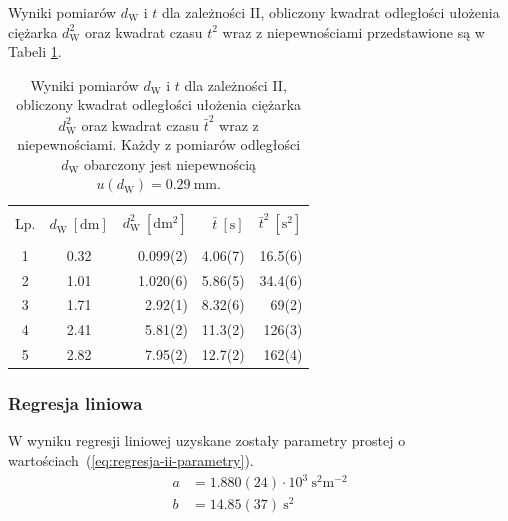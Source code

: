 \documentclass[twocolumn, a4paper, polish, 10pt]{article}
\newcommand{\dwSq}{\ensuremath{ d_{\mathrm{W}}^2 }}
\begin{document}
Wyniki pomiarów $d_{\mathrm{W}}$ i $t$ dla zależności II, obliczony kwadrat odległości ułożenia ciężarka $\dwSq$ oraz kwadrat czasu $t^2$ wraz z niepewnościami przedstawione są w Tabeli \ref{tab:zaleznosc-ii}.
\begin{table}[ht]
\begin{center}
\renewcommand*{\tablename}{Tabela}
\caption{\small Wyniki pomiarów $d_{\mathrm{W}}$ i $t$ dla zależności II, obliczony kwadrat odległości ułożenia ciężarka $\dwSq$ oraz kwadrat czasu $\bar{t}^2$ wraz z niepewnościami. Każdy z pomiarów odległości $d_{\mathrm{W}}$ obarczony jest niepewnością $u(d_{\mathrm{W}}) = 0.29~\mathrm{mm}$.\vspace{0.15cm}
    \label{tab:zaleznosc-ii}}
    {\small
    \begin{tabular}{c c r r r}
    \hline \vspace{-0.35cm} \\
      Lp. & $d_{\mathrm{W}}~[\mathrm{dm}]$ & $\dwSq~[\mathrm{dm^2}]$
      & $\bar{t}~[\mathrm{s}]$ & $\bar{t}^2~[\mathrm{s^2}]$ \\ 
      \hline \vspace{-0.2cm} \\
      1 & 0.32 & 0.099(2) & 4.06(7) & 16.5(6) \\
      2 & 1.01 & 1.020(6) & 5.86(5) & 34.4(6) \\
      3 & 1.71 & 2.92(1) & 8.32(6) & 69(2) \\
      4 & 2.41 & 5.81(2) & 11.3(2) & 126(3) \\
      5 & 2.82 & 7.95(2) & 12.7(2) & 162(4) \\
    \hline
    \end{tabular}}
    \end{center}
\end{table}

\subsubsection{Regresja liniowa}
W wyniku regresji liniowej uzyskane zostały parametry prostej o wartościach~(\ref{eq:regresja-ii-parametry}).
\begin{equation}
\begin{split}
    a &= 1.880(24) \cdot 10^3~\mathrm{ s^2 m^{-2} } \\
    b &= 14.85(37)~\mathrm{s^2}
    \label{eq:regresja-ii-parametry}
\end{split}
\end{equation}
\end{document}
